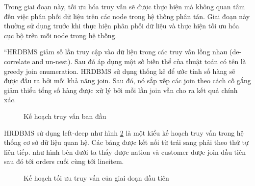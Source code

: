 \documentclass{article}[14pt]
\begin{document}
{Trong giai đoạn này, tối ưu hóa truy vấn sẽ được thực hiện mà không quan tâm đến việc phân phối dữ liệu trên các node trong hệ thống phân tán. Giai đoạn này thường sử dụng trước khi thực hiện phân phối dữ liệu và thực hiện tối ưu hóa cục bộ trên mỗi node trong hệ thống.

“HRDBMS giảm số lần truy cập vào dữ liệu trong các truy vấn lồng nhau (de-correlate and un-nest). Sau đó áp dụng một số biến thể của thuật toán có tên là greedy join enumeration\cite{arnold2019hrdbms}. HRDBMS sử dụng thống kê để ước tính số hàng sẽ được đầu ra bởi mỗi khả năng join. Sau đó, nó sắp xếp các join theo cách cố gắng giảm thiểu tổng số hàng được xử lý bởi mỗi lần join vẫn cho ra kết quả chính xác.

\begin{figure}[htbp]
\centering
{}
\captionsetup{font=Large}
\caption{Kế hoạch truy vấn ban đầu \cite{arnold2019hrdbms}}
\label{fig:phase1}
\end{figure}

HRDBMS sử dụng left-deep như hình \ref{fig:phase2}  là một kiểu kế hoạch truy vấn trong hệ thống cơ sở dữ liệu quan hệ. Các bảng được kết nối từ trái sang phải theo thứ tự liên tiếp. như hình bên dưới ta thấy được nation và customer được join đầu tiên sau đó tới orders cuối cùng tới lineitem.

\begin{figure}[htbp]
\centering
{}
\captionsetup{font=Large}
\caption{Kế hoạch tối ưu truy vấn của giai đoạn đầu tiên \cite{arnold2019hrdbms}}
\label{fig:phase2}
\end{figure}

}
\end{document}
